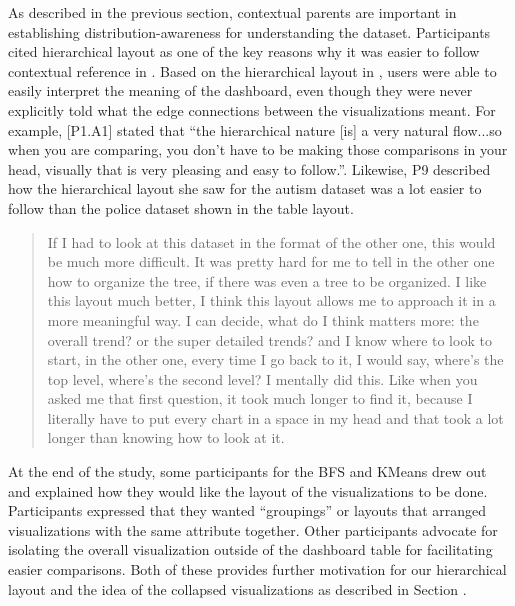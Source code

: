 \npar As described in the previous section, contextual parents are important in establishing distribution-awareness for understanding the dataset. Participants cited hierarchical layout as one of the key reasons why it was easier to follow contextual reference in \system. Based on the hierarchical layout in \system, users were able to easily interpret the meaning of the dashboard, even though they were never explicitly told what the edge connections between the visualizations meant. For example, [P1.A1] stated that ``the hierarchical nature [is] a very natural flow...so when you are comparing, you don't have to be making those comparisons in your head, visually that is very pleasing and easy to follow.''. %
Likewise, P9 described how the hierarchical layout she saw for the autism dataset was a lot easier to follow than the police dataset shown in the table layout.
\begin{quote}
If I had to look at this dataset in the format of the other one, this would be much more difficult. It was pretty hard for me to tell in the other one how to organize the tree, if there was even a tree to be organized. I like this layout much better, I think this layout allows me to approach it in a more meaningful way. I can decide, what do I think matters more: the overall trend? or the super detailed trends? and I know where to look to start, in the other one, every time I go back to it, I would say, where's the top level, where's the second level? I mentally did this. Like when you asked me that first question, it took much longer to find it, because I literally have to put every chart in a space in my head and that took a lot longer than knowing how to look at it.
\end{quote}
At the end of the study, some participants for the BFS and KMeans drew out and explained how they would like the layout of the visualizations to be done. Participants expressed that they wanted ``groupings'' or layouts that arranged visualizations with the same attribute together. Other participants advocate for isolating the overall visualization outside of the dashboard table for facilitating easier comparisons. Both of these provides further motivation for our hierarchical layout and the idea of the collapsed visualizations as described in Section \label{interaction}.
